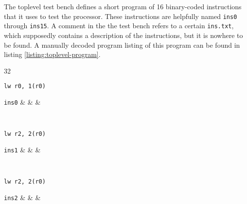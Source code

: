 The toplevel test bench defines a short program of 16 binary-coded instructions that it uses to test the processor.
These instructions are helpfully named \texttt{ins0} through \texttt{ins15}.
A comment in the the test bench refers to a certain \texttt{ins.txt}, which supposedly contains a description of the instructions, but it is nowhere to be found.
A manually decoded program listing of this program can be found in listing \vref{listing:toplevel-program}.

\begin{listing}
\begin{center}
\begin{bytefield}[rightcurly=., rightcurlyspace=0pt, leftcurly=., leftcurlyspace=0pt]{32}
 \\

\begin{rightwordgroup}{\texttt{lw r0, 1(r0)}}
\begin{leftwordgroup}{\texttt{ins0}}
& 
& 
& 
\end{leftwordgroup}
\end{rightwordgroup} \\

\begin{rightwordgroup}{\texttt{lw r2, 2(r0)}}
\begin{leftwordgroup}{\texttt{ins1}}
& 
& 
& 
\end{leftwordgroup}
\end{rightwordgroup} \\

\begin{rightwordgroup}{\texttt{lw r2, 2(r0)}}
\begin{leftwordgroup}{\texttt{ins2}}
& 
& 
& 
\end{leftwordgroup}
\end{rightwordgroup} \\


\end{bytefield}
\end{center}
\end{listing}
